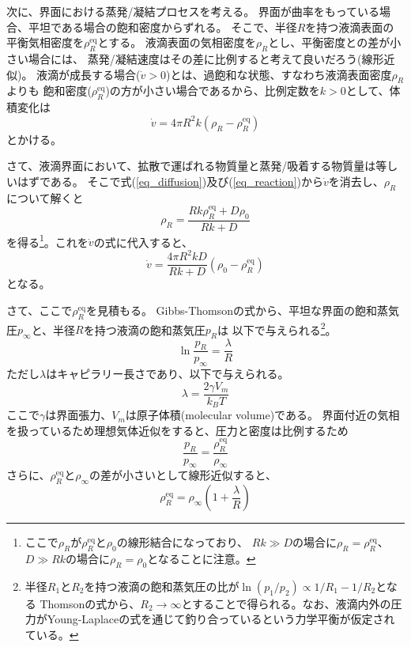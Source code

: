 \documentclass{jarticle}
\begin{document}
次に、界面における蒸発/凝結プロセスを考える。
界面が曲率をもっている場合、平坦である場合の飽和密度からずれる。
そこで、半径$R$を持つ液滴表面の平衡気相密度を$\rho_R^{\mathrm{eq}}$とする。
液滴表面の気相密度を$\rho_R$とし、平衡密度との差が小さい場合には、
蒸発/凝結速度はその差に比例すると考えて良いだろう(線形近似)。
液滴が成長する場合($\dot{v}>0$)とは、過飽和な状態、すなわち液滴表面密度$\rho_R$よりも
飽和密度($\rho_R^{\mathrm{eq}}$)の方が小さい場合であるから、比例定数を$k>0$として、体積変化は
\begin{equation}
    \dot{v} = 4 \pi R^2 k (\rho_R - \rho_R^{\mathrm{eq}} ) \label{eq_reaction}
\end{equation}
とかける。

さて、液滴界面において、拡散で運ばれる物質量と蒸発/吸着する物質量は等しいはずである。
そこで式(\ref{eq_diffusion})及び(\ref{eq_reaction})から$\dot{v}$を消去し、$\rho_R$について解くと
\begin{equation}
    \rho_R = \frac{Rk\rho_R^{\mathrm{eq}} + D \rho_0 }{Rk + D} \label{eq_rhor}
\end{equation}
を得る\footnote{ここで$\rho_R$が$\rho_R^{\mathrm{eq}}$と$\rho_0 $の線形結合になっており、
    $Rk \gg D$の場合に$\rho_R = \rho_R^{\mathrm{eq}}$、
    $D \gg Rk$の場合に$\rho_R = \rho_0$となることに注意。
}。これを$\dot{v}$の式に代入すると、
\begin{equation}
    \dot{v} = \frac{4 \pi R^2 kD}{Rk + D} (\rho_0 - \rho_R^{\mathrm{eq}}) \label{eq_vdot2}
\end{equation}
となる。

さて、ここで$\rho_R^{\mathrm{eq}}$を見積もる。
Gibbs-Thomsonの式から、平坦な界面の飽和蒸気圧$p_\infty$と、半径$R$を持つ液滴の飽和蒸気圧$p_R$は
以下で与えられる\footnote{半径$R_1$と$R_2$を持つ液滴の飽和蒸気圧の比が$\ln (p_1/p_2) \propto 1/R_1 - 1/R_2$となる
    Thomsonの式から、$R_2\rightarrow \infty$とすることで得られる。なお、液滴内外の圧力がYoung-Laplaceの式を通じて釣り合っているという力学平衡が仮定されている。
}。
\begin{equation}
    \ln \frac{p_R}{p_\infty} = \frac{\lambda}{R}
\end{equation}
ただし$\lambda$はキャピラリー長さであり、以下で与えられる。
\begin{equation}
    \lambda = \frac{2 \gamma V_m}{k_B T}
\end{equation}
ここで$\gamma$は界面張力、$V_m$は原子体積(molecular volume)である。
界面付近の気相を扱っているため理想気体近似をすると、圧力と密度は比例するため
\begin{equation}
    \frac{p_R}{p_\infty} = \frac{\rho_R^{\mathrm{eq}}}{\rho_\infty}
\end{equation}
さらに、$\rho_R^{\mathrm{eq}}$と$\rho_\infty$の差が小さいとして線形近似すると、
\begin{equation}
    \rho_R^\mathrm{eq} = \rho_\infty\left(1 + \frac{\lambda}{R} \right)
\end{equation}
\end{document}
